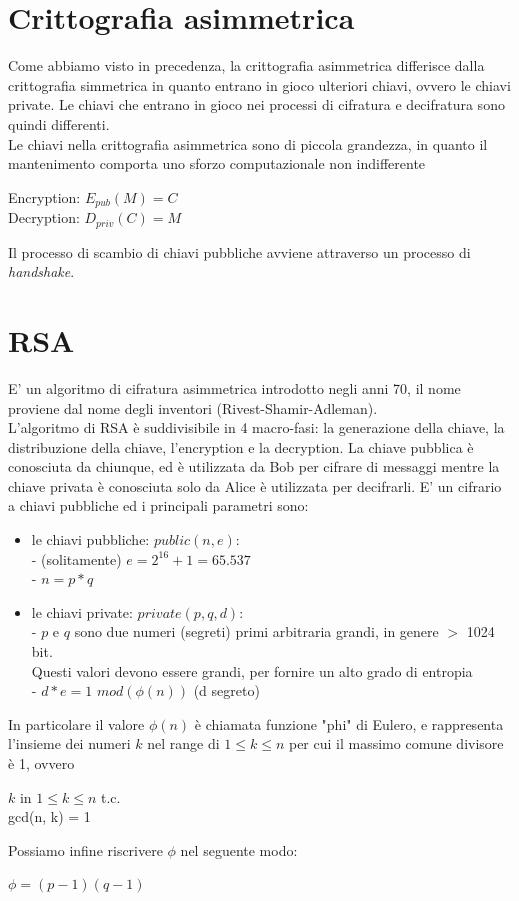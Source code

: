 \documentclass[11pt, oneside]{article}   	%
\begin{document}
\section*{Crittografia asimmetrica}
Come abbiamo visto in precedenza, la crittografia asimmetrica differisce dalla crittografia simmetrica in quanto entrano in gioco ulteriori chiavi, ovvero le chiavi private. Le chiavi che entrano in gioco nei processi di cifratura e decifratura sono quindi differenti. \\Le chiavi nella crittografia asimmetrica sono di piccola grandezza, in quanto il mantenimento comporta uno sforzo computazionale non indifferente
\begin{center}
Encryption: $E_{pub}(M) = C$ \\
Decryption: $D_{priv}(C) = M$ 
\end{center}
Il processo di scambio di chiavi pubbliche avviene attraverso un processo di \emph{handshake}.
\section*{RSA}
E' un algoritmo di cifratura asimmetrica introdotto negli anni 70, il nome proviene dal nome degli inventori (Rivest-Shamir-Adleman).\\
L'algoritmo di RSA è suddivisibile in 4 macro-fasi: la generazione della chiave, la distribuzione della chiave, l'encryption e la decryption. La chiave pubblica è conosciuta da chiunque, ed è utilizzata da Bob per cifrare di messaggi mentre la chiave privata è conosciuta solo da Alice è utilizzata per decifrarli.
E' un cifrario a chiavi pubbliche ed i principali parametri sono:
\begin{itemize}
\item le chiavi pubbliche: $public(n,e)$:\\
- (solitamente) $e = 2^{16}+1 = 65.537$\\
- $n = p * q$
\item le chiavi private: $private(p,q,d)$:\\
- $p$ e $q$ sono due numeri (segreti) primi arbitraria grandi, in genere $>$ 1024 bit.\\
Questi valori devono essere grandi, per fornire un alto grado di entropia\\
- $d * e = 1$ $mod(\phi(n))$ (d segreto)
\end{itemize}
In particolare il valore $\phi(n)$ è chiamata funzione "phi" di Eulero, e rappresenta l'insieme dei numeri $k$ nel range di $1 \leq k \leq n$ per cui il massimo comune divisore è 1, ovvero
\begin{center}
$k$ in $1 \leq k \leq n$ t.c. \\
gcd(n, k) = 1\end{center}
Possiamo infine riscrivere $\phi$ nel seguente modo:
\begin{center}
$\phi = (p-1)(q-1)$
\end{center}
\end{document}
